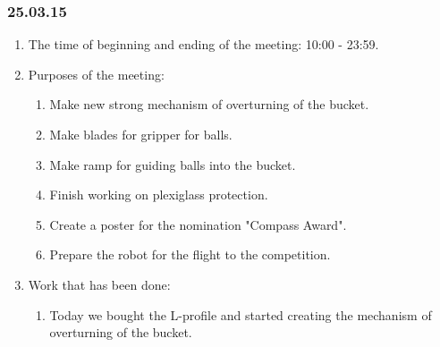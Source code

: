 \subsubsection{25.03.15}
\begin{enumerate}
	
	\item The time of beginning and ending of the meeting: 10:00 - 23:59.
	
	\item Purposes of the meeting: 
	\begin{enumerate}
		
		\item Make new strong mechanism of overturning of the bucket.
		
		\item Make blades for gripper for balls.
		
        \item Make ramp for guiding balls into the bucket.
        
        \item Finish working on plexiglass protection.
        
        \item Create a poster for the nomination "Compass Award".
        
        \item Prepare the robot for the flight to the competition.
		
	\end{enumerate}

	\item Work that has been done:
	\begin{enumerate}
		
		\item Today we bought the L-profile and started creating the mechanism of overturning of the bucket.
		

\end{enumerate}
\end{enumerate}
